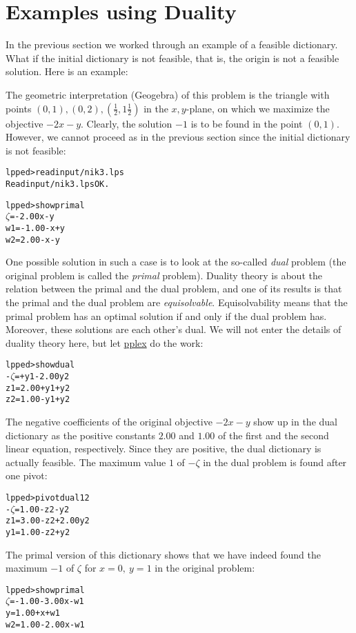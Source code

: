 \documentclass[ukenglish]{nik}
\begin{document}
\section{Examples using Duality}
In the previous section we worked through an example of a feasible dictionary.
What if the initial dictionary is not feasible, that is, the origin is not a
feasible solution. Here is an example:
\begin{alltt}

\end{alltt}
The geometric interpretation (Geogebra) of this problem is the
triangle with points $(0,1),(0,2),(\frac{1}{2},1\frac{1}{2})$
in the $x,y$-plane, on which we maximize the objective $-2x-y$.
Clearly, the solution $-1$ is to be found in the point $(0,1)$.
However, we cannot proceed as in the previous section since the
initial dictionary is not feasible:
\begin{alltt}
lpped> read input/nik3.lps
Read input/nik3.lps OK.

lpped> show primal
 \(\zeta\) =        - 2.00x - y
w1 = - 1.00 -     x + y
w2 =   2.00 -     x - y
\end{alltt}
One possible solution in such a case is to look at the so-called
\emph{dual} problem (the original problem is called the \emph{primal} problem).
Duality theory is about the relation between the primal and the dual problem,
and one of its results is that the primal and the dual problem are \emph{equisolvable}.
Equisolvability means that the primal problem has an optimal solution if and only if 
the dual problem has. Moreover, these solutions are each other's dual.
We will not enter the details of duality theory here, but let \url{pplex} do the work:
\begin{alltt}
lpped> show dual
-\(\zeta\) =      + y1 - 2.00y2
z1 = 2.00 + y1 +     y2
z2 = 1.00 - y1 +     y2
\end{alltt}
The negative coefficients of the original objective $-2x-y$ show up in the dual
dictionary as the positive constants $2.00$ and $1.00$ of the first and the second 
linear equation, respectively. Since they are positive, the dual dictionary is actually feasible.
The maximum value $1$ of \(-\zeta\) in the dual problem is found after one pivot:
\begin{alltt}
lpped> pivot dual 1 2
-\(\zeta\) = 1.00 - z2 -     y2
z1 = 3.00 - z2 + 2.00y2
y1 = 1.00 - z2 +     y2
\end{alltt}
The primal version of this dictionary shows that we have indeed found the
maximum $-1$ of $\zeta$ for $x=0,~y=1$ in the original problem:
\begin{alltt}
lpped> show primal
 \(\zeta\) = - 1.00 - 3.00x - w1
 y =   1.00 +     x + w1
w2 =   1.00 - 2.00x - w1
\end{alltt}
\end{document}
